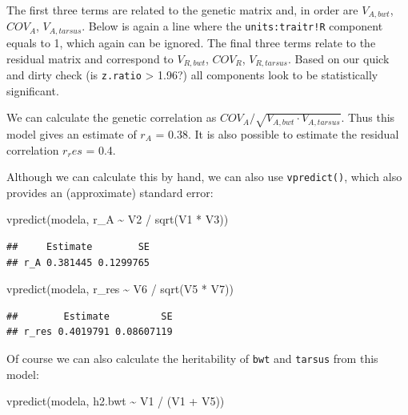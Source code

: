\documentclass[
  12pt,
]{book}
\newenvironment{Shaded}{\begin{snugshade}}{\end{snugshade}}
\newcommand{\FunctionTok}[1]{\textcolor[rgb]{0.00,0.00,0.00}{#1}}
\newcommand{\NormalTok}[1]{#1}
\newcommand{\SpecialCharTok}[1]{\textcolor[rgb]{0.00,0.00,0.00}{#1}}
\begin{document}
The first three terms are related to the genetic matrix and, in order are \(V_{A,bwt}\), \(COV_A\), \(V_{A, tarsus}\). Below is again a line where the \texttt{units:traitr!R} component equals to 1, which again can be ignored. The final three terms relate to the residual matrix and correspond to \(V_{R,bwt}\), \(COV_R\), \(V_{R,tarsus}\). Based on our quick and dirty check (is \texttt{z.ratio} \textgreater{} 1.96?) all components look to be statistically significant.

We can calculate the genetic correlation as \(COV_A / \sqrt{V_{A,bwt} \cdot V_{A,tarsus}}\). Thus this model gives an estimate of \(r_A\) = 0.38. It is also possible to estimate the residual correlation \(r_res\) = 0.4.

Although we can calculate this by hand, we can also use \texttt{vpredict()}, which also provides an (approximate) standard error:

\begin{Shaded}
\begin{Highlighting}[]
\FunctionTok{vpredict}\NormalTok{(modela, r\_A }\SpecialCharTok{\textasciitilde{}}\NormalTok{ V2 }\SpecialCharTok{/} \FunctionTok{sqrt}\NormalTok{(V1 }\SpecialCharTok{*}\NormalTok{ V3))}
\end{Highlighting}
\end{Shaded}

\begin{verbatim}
##     Estimate        SE
## r_A 0.381445 0.1299765
\end{verbatim}

\begin{Shaded}
\begin{Highlighting}[]
\FunctionTok{vpredict}\NormalTok{(modela, r\_res }\SpecialCharTok{\textasciitilde{}}\NormalTok{ V6 }\SpecialCharTok{/} \FunctionTok{sqrt}\NormalTok{(V5 }\SpecialCharTok{*}\NormalTok{ V7))}
\end{Highlighting}
\end{Shaded}

\begin{verbatim}
##        Estimate         SE
## r_res 0.4019791 0.08607119
\end{verbatim}

Of course we can also calculate the heritability of \texttt{bwt} and \texttt{tarsus} from this model:

\begin{Shaded}
\begin{Highlighting}[]
\FunctionTok{vpredict}\NormalTok{(modela, h2.bwt }\SpecialCharTok{\textasciitilde{}}\NormalTok{ V1 }\SpecialCharTok{/}\NormalTok{ (V1 }\SpecialCharTok{+}\NormalTok{ V5))}
\end{Highlighting}
\end{Shaded}
\end{document}

